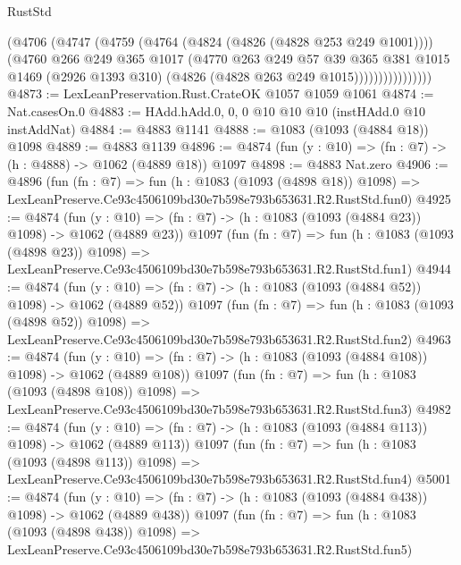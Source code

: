 \begin{lexlean}{RustStd}
\begin{coremodule}
                      (@4706
                        (@4747
                          (@4759
                            (@4764 (@4824 (@4826 (@4828 @253 @249 @1001))))
                            (@4760
                              @266
                              @249
                              @365
                              @1017
                              (@4770
                                @263
                                @249
                                @57
                                @39
                                @365
                                @381
                                @1015
                                @1469
                                (@2926 @1393 @310)
                                (@4826 (@4828 @263 @249 @1015))))))))))))))))
@4873 := LexLeanPreservation.Rust.CrateOK @1057 @1059 @1061
@4874 := Nat.casesOn.{0}
@4883 := HAdd.hAdd.{0, 0, 0} @10 @10 @10 (instHAdd.{0} @10 instAddNat)
@4884 := @4883 @1141
@4888 := @1083 (@1093 (@4884 @18)) @1098
@4889 := @4883 @1139
@4896 := @4874 (fun (y : @10) => (fn : @7) -> (h : @4888) -> @1062 (@4889 @18)) @1097
@4898 := @4883 Nat.zero
@4906 := @4896
    (fun (fn : @7) =>
    fun (h : @1083 (@1093 (@4898 @18)) @1098) =>
    LexLeanPreserve.Ce93c4506109bd30e7b598e793b653631.R2.RustStd.fun0)
@4925 := @4874
    (fun (y : @10) => (fn : @7) -> (h : @1083 (@1093 (@4884 @23)) @1098) -> @1062 (@4889 @23))
    @1097
    (fun (fn : @7) =>
    fun (h : @1083 (@1093 (@4898 @23)) @1098) =>
    LexLeanPreserve.Ce93c4506109bd30e7b598e793b653631.R2.RustStd.fun1)
@4944 := @4874
    (fun (y : @10) => (fn : @7) -> (h : @1083 (@1093 (@4884 @52)) @1098) -> @1062 (@4889 @52))
    @1097
    (fun (fn : @7) =>
    fun (h : @1083 (@1093 (@4898 @52)) @1098) =>
    LexLeanPreserve.Ce93c4506109bd30e7b598e793b653631.R2.RustStd.fun2)
@4963 := @4874
    (fun (y : @10) => (fn : @7) -> (h : @1083 (@1093 (@4884 @108)) @1098) -> @1062 (@4889 @108))
    @1097
    (fun (fn : @7) =>
    fun (h : @1083 (@1093 (@4898 @108)) @1098) =>
    LexLeanPreserve.Ce93c4506109bd30e7b598e793b653631.R2.RustStd.fun3)
@4982 := @4874
    (fun (y : @10) => (fn : @7) -> (h : @1083 (@1093 (@4884 @113)) @1098) -> @1062 (@4889 @113))
    @1097
    (fun (fn : @7) =>
    fun (h : @1083 (@1093 (@4898 @113)) @1098) =>
    LexLeanPreserve.Ce93c4506109bd30e7b598e793b653631.R2.RustStd.fun4)
@5001 := @4874
    (fun (y : @10) => (fn : @7) -> (h : @1083 (@1093 (@4884 @438)) @1098) -> @1062 (@4889 @438))
    @1097
    (fun (fn : @7) =>
    fun (h : @1083 (@1093 (@4898 @438)) @1098) =>
    LexLeanPreserve.Ce93c4506109bd30e7b598e793b653631.R2.RustStd.fun5)

\end{coremodule}
\end{lexlean}
